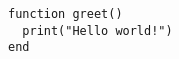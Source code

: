 \documentclass{article}
\begin{document}
\begin{verbatim}
function greet()
  print("Hello world!")
end
\end{verbatim}

\inputminted{lua}{file.lua}
\end{document}
